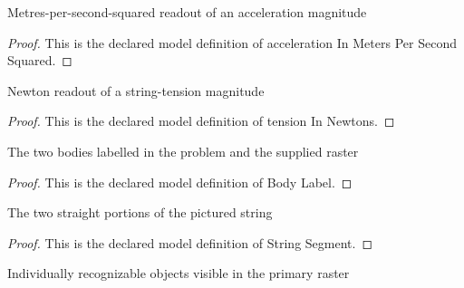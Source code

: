 \begin{definition}
  \label{def:physics:phyx-mini-0805:phyxminiproblems-problemphyxmini0805-accelerationinmeterspersecondsquared}
  Metres-per-second-squared readout of an acceleration magnitude
\end{definition}
\begin{proof}
  This is the declared model definition of acceleration In Meters Per Second Squared.
\end{proof}
\begin{definition}
  \label{def:physics:phyx-mini-0805:phyxminiproblems-problemphyxmini0805-tensioninnewtons}
  Newton readout of a string-tension magnitude
\end{definition}
\begin{proof}
  This is the declared model definition of tension In Newtons.
\end{proof}
\begin{definition}
  \label{def:physics:phyx-mini-0805:phyxminiproblems-problemphyxmini0805-bodylabel}
  The two bodies labelled in the problem and the supplied raster
\end{definition}
\begin{proof}
  This is the declared model definition of Body Label.
\end{proof}
\begin{definition}
  \label{def:physics:phyx-mini-0805:phyxminiproblems-problemphyxmini0805-stringsegment}
  The two straight portions of the pictured string
\end{definition}
\begin{proof}
  This is the declared model definition of String Segment.
\end{proof}
\begin{definition}
  \label{def:physics:phyx-mini-0805:phyxminiproblems-problemphyxmini0805-figureobject}
  Individually recognizable objects visible in the primary raster
\end{definition}

